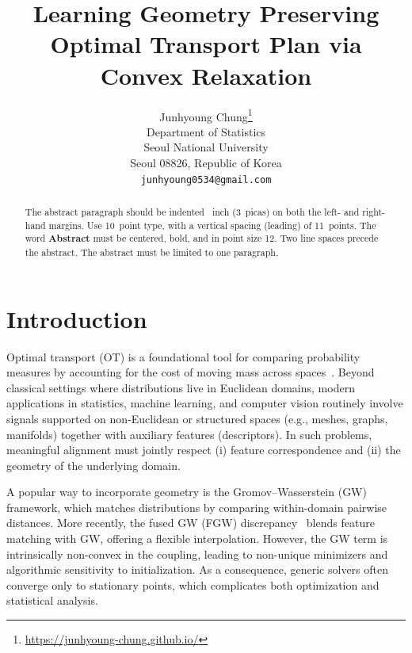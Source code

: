 \documentclass{article}
\title{Learning Geometry Preserving Optimal Transport Plan via Convex Relaxation}
\author{%
  Junhyoung Chung\thanks{\href{https://junhyoung-chung.github.io/}{https://junhyoung-chung.github.io/}} \\
  Department of Statistics\\
  Seoul National University\\
  Seoul 08826, Republic of Korea \\
  \texttt{junhyoung0534@gmail.com} \\
}
\begin{document}
\maketitle


\begin{abstract}
  The abstract paragraph should be indented ~inch (3~picas) on
  both the left- and right-hand margins. Use 10~point type, with a vertical
  spacing (leading) of 11~points.  The word \textbf{Abstract} must be centered,
  bold, and in point size 12. Two line spaces precede the abstract. The abstract
  must be limited to one paragraph.
\end{abstract}


\section{Introduction}

Optimal transport (OT) is a foundational tool for comparing probability measures by accounting for the cost of moving mass across spaces~\citep{villani2008optimal}. Beyond classical settings where distributions live in Euclidean domains, modern applications in statistics, machine learning, and computer vision routinely involve signals supported on non-Euclidean or structured spaces (e.g., meshes, graphs, manifolds) together with auxiliary features (descriptors). In such problems, meaningful alignment must jointly respect (i) feature correspondence and (ii) the geometry of the underlying domain.

A popular way to incorporate geometry is the Gromov--Wasserstein (GW) framework, which matches distributions by comparing within-domain pairwise distances. More recently, the fused GW (FGW) discrepancy~\citep{vayer2020fused} blends feature matching with GW, offering a flexible interpolation. However, the GW term is intrinsically non-convex in the coupling, leading to non-unique minimizers and algorithmic sensitivity to initialization. As a consequence, generic solvers often converge only to stationary points, which complicates both optimization and statistical analysis.
\end{document}

